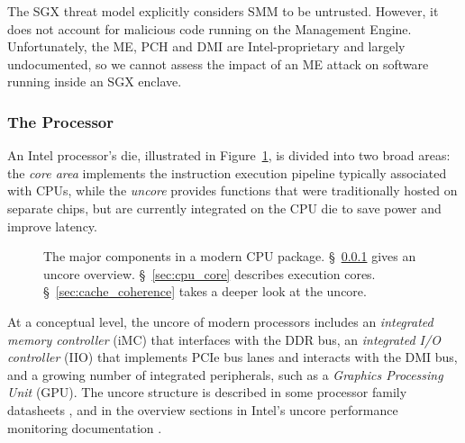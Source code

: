 The SGX threat model explicitly considers SMM to be untrusted. However, it does
not account for malicious code running on the Management Engine. Unfortunately,
the ME, PCH and DMI are Intel-proprietary and largely undocumented, so we
cannot assess the impact of an ME attack on software running inside an SGX
enclave.


\subsubsection{The Processor}
\label{sec:cpu_die}

An Intel processor's die, illustrated in Figure~\ref{fig:cpu_die}, is divided
into two broad areas: the \textit{core area} implements the instruction
execution pipeline typically associated with CPUs, while the \textit{uncore}
provides functions that were traditionally hosted on separate chips, but are
currently integrated on the CPU die to save power and improve latency.

\begin{figure}[hbt]
  \caption{
    The major components in a modern CPU package. \S~\ref{sec:cpu_die} gives
    an uncore overview. \S~\ref{sec:cpu_core} describes execution cores.
    \S~\ref{sec:cache_coherence} takes a deeper look at the uncore.
  }
  \label{fig:cpu_die}
\end{figure}


At a conceptual level, the uncore of modern processors includes an
\textit{integrated memory controller} (iMC) that interfaces with the DDR bus,
an \textit{integrated I/O controller} (IIO) that implements PCIe bus lanes and
interacts with the DMI bus, and a growing number of integrated peripherals,
such as a \textit{Graphics Processing Unit} (GPU). The uncore structure is
described in some processor family datasheets \cite{intel2014datasheet,
intel2010datasheet}, and in the overview sections in Intel's uncore performance
monitoring documentation \cite{intel2014uncore, intel2012uncore,
intel2010uncore}.

